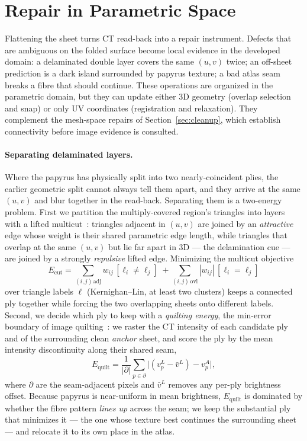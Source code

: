 \section{Repair in Parametric Space}
\label{sec:repair}

Flattening the sheet turns CT read-back into a repair instrument. Defects that are ambiguous on the folded surface become local evidence in the developed domain: a delaminated double layer covers the same $(u,v)$ twice; an off-sheet prediction is a dark island surrounded by papyrus texture; a bad atlas seam breaks a fibre that should continue. These operations are organized in the parametric domain, but they can update either 3D geometry (overlap selection and snap) or only UV coordinates (registration and relaxation). They complement the mesh-space repairs of Section~\ref{sec:cleanup}, which establish connectivity before image evidence is consulted.

\paragraph{Separating delaminated layers.} Where the papyrus has physically split into two nearly-coincident plies, the earlier geometric split cannot always tell them apart, and they arrive at the same $(u,v)$ and blur together in the read-back. Separating them is a two-energy problem. First we partition the multiply-covered region's triangles into layers with a lifted multicut~\cite{keuper2015efficient}: triangles adjacent in $(u,v)$ are joined by an {\em attractive} edge whose weight is their shared parametric edge length, while triangles that overlap at the same $(u,v)$ but lie far apart in 3D --- the delamination cue --- are joined by a strongly {\em repulsive} lifted edge. Minimizing the multicut objective
\begin{equation*}
  E_{\mathrm{cut}} = \!\!\sum_{(i,j)\,\mathrm{adj}}\!\! w_{ij}\,[\ell_i \neq \ell_j] \;+\!\! \sum_{(i,j)\,\mathrm{ovl}}\!\! |w_{ij}|\,[\ell_i = \ell_j]
\end{equation*}
over triangle labels $\ell$ (Kernighan--Lin, at least two clusters) keeps a connected ply together while forcing the two overlapping sheets onto different labels. Second, we decide which ply to keep with a {\em quilting energy}, the min-error boundary of image quilting~\cite{efros2001image}: we raster the CT intensity of each candidate ply and of the surrounding clean {\em anchor} sheet, and score the ply by the mean intensity discontinuity along their shared seam,
\begin{equation*}
  E_{\mathrm{quilt}} = \frac{1}{|\partial|}\sum_{p \in \partial} \bigl| (v^{L}_p - \bar v^{L}) - v^{A}_p \bigr|,
\end{equation*}
where $\partial$ are the seam-adjacent pixels and $\bar v^{L}$ removes any per-ply brightness offset. Because papyrus is near-uniform in mean brightness, $E_{\mathrm{quilt}}$ is dominated by whether the fibre pattern {\em lines up} across the seam; we keep the substantial ply that minimizes it --- the one whose texture best continues the surrounding sheet --- and relocate it to its own place in the atlas.


